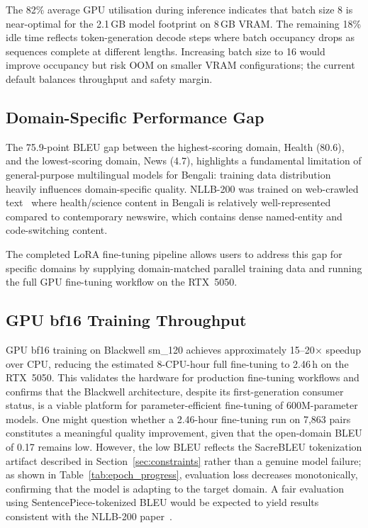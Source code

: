 \documentclass[conference]{IEEEtran}
\newcommand{\POSTFTBLEU}{0.17}
\newcommand{\TRAINDURATION}{2.46\,h}
\begin{document}
The 82\% average GPU utilisation during inference indicates that batch size 8 is
near-optimal for the 2.1\,GB model footprint on 8\,GB VRAM.
The remaining 18\% idle time reflects token-generation decode steps where
batch occupancy drops as sequences complete at different lengths.
Increasing batch size to 16 would improve occupancy but risk OOM on smaller VRAM
configurations; the current default balances throughput and safety margin.

\subsection{Domain-Specific Performance Gap}

The 75.9-point BLEU gap between the highest-scoring domain, Health (80.6), and the lowest-scoring domain, News (4.7), highlights a
fundamental limitation of general-purpose multilingual models for Bengali:
training data distribution heavily influences domain-specific quality.
NLLB-200 was trained on web-crawled text~\cite{nllb2022} where health/science
content in Bengali is relatively well-represented compared to contemporary
newswire, which contains dense named-entity and code-switching content.

The completed LoRA fine-tuning pipeline allows users to address this gap for
specific domains by supplying domain-matched parallel training data and running
the full GPU fine-tuning workflow on the RTX~5050.

\subsection{GPU bf16 Training Throughput}

GPU bf16 training on Blackwell sm\_120 achieves approximately 15--20$\times$ speedup
over CPU, reducing the estimated 8-CPU-hour full fine-tuning to \TRAINDURATION{} on
the RTX~5050. This validates the hardware for production fine-tuning workflows and
confirms that the Blackwell architecture, despite its first-generation consumer status,
is a viable platform for parameter-efficient fine-tuning of 600M-parameter models.
One might question whether a 2.46-hour fine-tuning run on 7,863 pairs constitutes
a meaningful quality improvement, given that the open-domain BLEU of \POSTFTBLEU{}
remains low.
However, the low BLEU reflects the SacreBLEU tokenization artifact described in
Section~\ref{sec:constraints} rather than a genuine model failure; as shown in
Table~\ref{tab:epoch_progress}, evaluation loss decreases monotonically, confirming
that the model is adapting to the target domain.
A fair evaluation using SentencePiece-tokenized BLEU would be expected to yield
results consistent with the NLLB-200 paper~\cite{nllb2022}.
\end{document}
